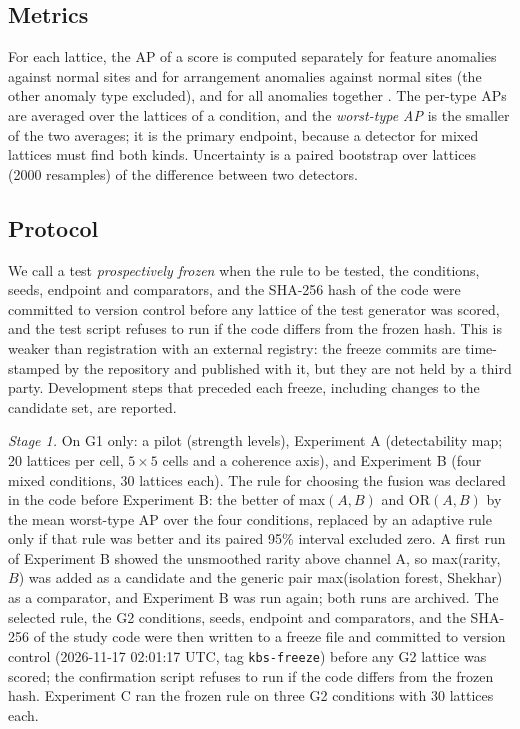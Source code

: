 \documentclass[preprint,review,12pt]{elsarticle}
\begin{document}
\subsection{Metrics}
For each lattice, the AP of a score is computed separately for feature anomalies against normal sites and for arrangement anomalies against normal sites (the other anomaly type excluded), and for all anomalies together \citep{Davis2006}. The per-type APs are averaged over the lattices of a condition, and the \emph{worst-type AP} is the smaller of the two averages; it is the primary endpoint, because a detector for mixed lattices must find both kinds. Uncertainty is a paired bootstrap over lattices (2000 resamples) of the difference between two detectors.

\subsection{Protocol}
We call a test \emph{prospectively frozen} when the rule to be tested, the conditions, seeds, endpoint and comparators, and the SHA-256 hash of the code were committed to version control before any lattice of the test generator was scored, and the test script refuses to run if the code differs from the frozen hash. This is weaker than registration with an external registry: the freeze commits are time-stamped by the repository and published with it, but they are not held by a third party. Development steps that preceded each freeze, including changes to the candidate set, are reported.

\emph{Stage 1.} On G1 only: a pilot (strength levels), Experiment A (detectability map; 20 lattices per cell, $5\times5$ cells and a coherence axis), and Experiment B (four mixed conditions, 30 lattices each). The rule for choosing the fusion was declared in the code before Experiment B: the better of max$(A,B)$ and OR$(A,B)$ by the mean worst-type AP over the four conditions, replaced by an adaptive rule only if that rule was better and its paired 95\% interval excluded zero. A first run of Experiment B showed the unsmoothed rarity above channel A, so max(rarity, $B$) was added as a candidate and the generic pair max(isolation forest, Shekhar) as a comparator, and Experiment B was run again; both runs are archived. The selected rule, the G2 conditions, seeds, endpoint and comparators, and the SHA-256 of the study code were then written to a freeze file and committed to version control (2026-11-17 02:01:17 UTC, tag \texttt{kbs-freeze}) before any G2 lattice was scored; the confirmation script refuses to run if the code differs from the frozen hash. Experiment C ran the frozen rule on three G2 conditions with 30 lattices each.
\end{document}
